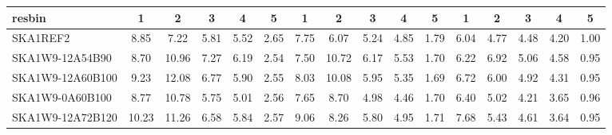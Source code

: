\begin{table}[H]
{{\begin{tabular}{|lccccc||ccccc||ccccc|}
 resbin  &1 & 2 & 3 & 4 & 5 & 1 & 2 & 3 & 4 & 5 & 1 & 2 & 3 & 4 & 5 \\ \hline
SKA1REF2 & 8.85 \cellcolor{blue!20.97} & 7.22 \cellcolor{red!18.00} & 5.81 \cellcolor{green!19.66} & 5.52 \cellcolor{orange!36.15} & 2.65 \cellcolor{purple!60.00} & 7.75 \cellcolor{blue!23.05} & 6.07 \cellcolor{red!18.00} & 5.24 \cellcolor{green!27.18} & 4.85 \cellcolor{orange!33.31} & 1.79 \cellcolor{purple!60.00} & 6.04 \cellcolor{blue!18.00} & 4.77 \cellcolor{red!18.00} & 4.48 \cellcolor{green!31.34} & 4.20 \cellcolor{orange!47.53} & 1.00 \cellcolor{purple!60.00}\\ \hline 
SKA1W9-12A54B90 & 8.70 \cellcolor{blue!18.00} & 10.96 \cellcolor{red!50.32} & 7.27 \cellcolor{green!60.00} & 6.19 \cellcolor{orange!60.00} & 2.54 \cellcolor{purple!18.00} & 7.50 \cellcolor{blue!18.00} & 10.72 \cellcolor{red!60.00} & 6.17 \cellcolor{green!60.00} & 5.53 \cellcolor{orange!60.00} & 1.70 \cellcolor{purple!22.20} & 6.22 \cellcolor{blue!21.58} & 6.92 \cellcolor{red!60.00} & 5.06 \cellcolor{green!60.00} & 4.58 \cellcolor{orange!60.00} & 0.95 \cellcolor{purple!18.00}\\ \hline 
SKA1W9-12A60B100 & 9.23 \cellcolor{blue!28.50} & 12.08 \cellcolor{red!60.00} & 6.77 \cellcolor{green!46.18} & 5.90 \cellcolor{orange!49.68} & 2.55 \cellcolor{purple!21.82} & 8.03 \cellcolor{blue!28.70} & 10.08 \cellcolor{red!54.22} & 5.95 \cellcolor{green!52.24} & 5.35 \cellcolor{orange!52.93} & 1.69 \cellcolor{purple!18.00} & 6.72 \cellcolor{blue!31.54} & 6.00 \cellcolor{red!42.03} & 4.92 \cellcolor{green!53.08} & 4.31 \cellcolor{orange!51.14} & 0.95 \cellcolor{purple!18.00}\\ \hline 
SKA1W9-0A60B100 & 8.77 \cellcolor{blue!19.39} & 10.78 \cellcolor{red!48.77} & 5.75 \cellcolor{green!18.00} & 5.01 \cellcolor{orange!18.00} & 2.56 \cellcolor{purple!25.64} & 7.65 \cellcolor{blue!21.03} & 8.70 \cellcolor{red!41.75} & 4.98 \cellcolor{green!18.00} & 4.46 \cellcolor{orange!18.00} & 1.70 \cellcolor{purple!22.20} & 6.40 \cellcolor{blue!25.17} & 5.02 \cellcolor{red!22.88} & 4.21 \cellcolor{green!18.00} & 3.65 \cellcolor{orange!29.48} & 0.96 \cellcolor{purple!26.40}\\ \hline 
SKA1W9-12A72B120 & 10.23 \cellcolor{blue!48.31} & 11.26 \cellcolor{red!52.91} & 6.58 \cellcolor{green!40.93} & 5.84 \cellcolor{orange!47.54} & 2.57 \cellcolor{purple!29.45} & 9.06 \cellcolor{blue!49.50} & 8.26 \cellcolor{red!37.78} & 5.80 \cellcolor{green!46.94} & 4.95 \cellcolor{orange!37.23} & 1.71 \cellcolor{purple!26.40} & 7.68 \cellcolor{blue!50.64} & 5.43 \cellcolor{red!30.89} & 4.61 \cellcolor{green!37.76} & 3.64 \cellcolor{orange!29.16} & 0.95 \cellcolor{purple!18.00}\\ \hline 

\end{tabular}}}
\end{table}
